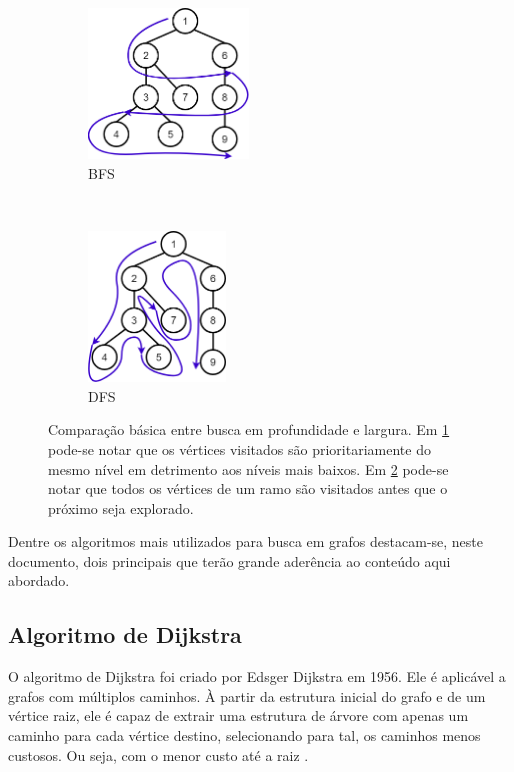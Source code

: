 \begin{figure}[t!]
	\centering
	\begin{subfigure}[t]{0.4\textwidth}
		\centering
		\includegraphics[height=4cm]{./figuras/BFS.png} %
		\caption{BFS}
		\label{fig_BFS}
	\end{subfigure}%
	~
	\begin{subfigure}[t]{0.4\textwidth}
		\centering
		\includegraphics[height=4cm]{./figuras/DFS.png} %
	\caption{DFS}
	\label{fig_DFS}
	\end{subfigure}
	\caption[Busca em Profundidade vs Largura]{Comparação básica entre busca em profundidade e largura. Em \ref{fig_BFS} pode-se notar que os vértices visitados são prioritariamente do mesmo nível em detrimento aos níveis mais baixos. Em \ref{fig_DFS} pode-se notar que todos os vértices de um ramo são visitados antes que o próximo seja explorado.}
	\label{fig-busca-grafo}
\end{figure}

Dentre os algoritmos mais utilizados para busca em grafos destacam-se, neste documento, dois principais que terão grande aderência ao conteúdo aqui abordado. 

\subsection{Algoritmo de Dijkstra}
O algoritmo de Dijkstra foi criado por Edsger Dijkstra em 1956. Ele é aplicável a grafos com múltiplos caminhos. À partir da estrutura inicial do grafo e de um vértice raiz, ele é capaz de extrair uma estrutura de árvore com apenas um caminho para cada vértice destino, selecionando para tal, os caminhos menos custosos. Ou seja, com o menor custo até a raiz \cite{Dijkstra1959}.

